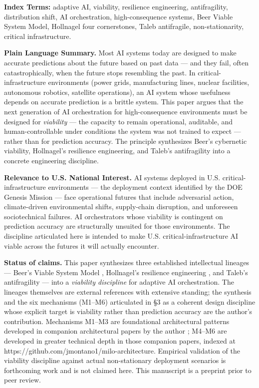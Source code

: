 \textbf{Index Terms:} adaptive AI, viability, resilience engineering,
antifragility, distribution shift, AI orchestration, high-consequence
systems, Beer Viable System Model, Hollnagel four cornerstones, Taleb
antifragile, non-stationarity, critical infrastructure.

\textbf{Plain Language Summary.} Most AI systems today are designed to
make accurate predictions about the future based on past data --- and
they fail, often catastrophically, when the future stops resembling the
past. In critical-infrastructure environments (power grids,
manufacturing lines, nuclear facilities, autonomous robotics, satellite
operations), an AI system whose usefulness depends on accurate
prediction is a brittle system. This paper argues that the next
generation of AI orchestration for high-consequence environments must be
designed for \emph{viability} --- the capacity to remain operational,
auditable, and human-controllable under conditions the system was not
trained to expect --- rather than for prediction accuracy. The principle
synthesizes Beer's cybernetic viability, Hollnagel's resilience
engineering, and Taleb's antifragility into a concrete engineering
discipline.

\textbf{Relevance to U.S. National Interest.} AI systems deployed in
U.S. critical-infrastructure environments --- the deployment context
identified by the DOE Genesis Mission --- face operational futures that
include adversarial action, climate-driven environmental shifts,
supply-chain disruption, and unforeseen sociotechnical failures. AI
orchestrators whose viability is contingent on prediction accuracy are
structurally unsuited for those environments. The discipline articulated
here is intended to make U.S. critical-infrastructure AI viable across
the futures it will actually encounter.

\textbf{Status of claims.} This paper synthesizes three established
intellectual lineages --- Beer's Viable System Model \cite{ref1},
Hollnagel's resilience engineering \cite{ref2}, and Taleb's antifragility
\cite{ref3} --- into a \emph{viability discipline} for adaptive AI
orchestration. The lineages themselves are external references with
extensive standing; the synthesis and the six mechanisms (M1--M6)
articulated in §3 as a coherent design discipline whose explicit target
is viability rather than prediction accuracy are the author's
contribution. Mechanisms M1--M3 are foundational architectural patterns
developed in companion architectural papers by the author \cite{ref4};
M4--M6 are developed in greater technical depth in those companion
papers, indexed at https://github.com/jmontano1/milo-architecture.
Empirical validation of the viability discipline against actual
non-stationary deployment scenarios is forthcoming work and is not
claimed here. This manuscript is a preprint prior to peer review.

